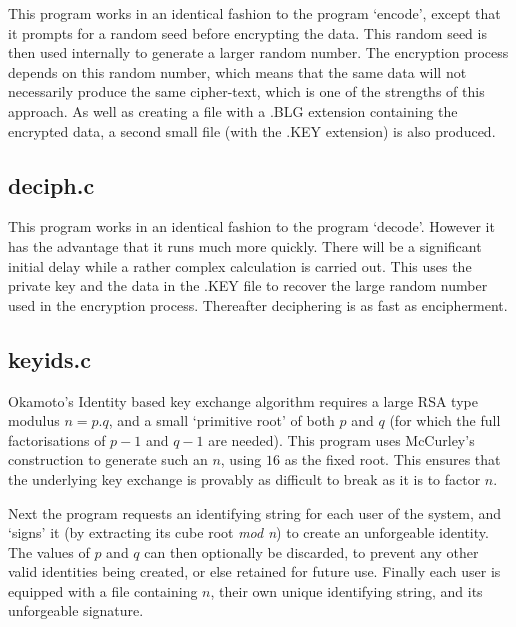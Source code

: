       This program works in an identical fashion to the  program  `encode', 
      except that it prompts for a random seed before encrypting the data.
      This random seed is then used internally to generate a larger random 
      number. The encryption process depends on this random number, which
      means that the same data will not necessarily produce the same 
      cipher-text, which is one of the strengths of this approach. As well as 
      creating a file with a .BLG extension containing the encrypted data,
      a second small file (with the .KEY extension) is also produced.


      \subsection{deciph.c}

      This program works in an identical fashion to the  program  `decode'.  
      However it has the advantage that it runs much more quickly. There will
      be a significant initial delay while a rather complex calculation 
      is carried out. This uses the private key and the data in the .KEY file
      to recover the large random number used in the encryption process. 
      Thereafter deciphering is as fast as encipherment.

      \subsection{keyids.c}

      Okamoto's Identity based key exchange algorithm \cite{Okamoto} requires 
      a large RSA type modulus $n=p.q$, and a small `primitive root' of both 
      $p$ and $q$ (for which the full factorisations of $p-1$ and $q-1$ 
      are needed). This program uses McCurley's construction \cite{McCurley} 
      to generate such an $n$, using $16$ as the fixed root. This ensures that 
      the underlying key exchange is provably as difficult to break as it is to 
      factor $n$.  

      Next the program requests an identifying string for each user of the 
      system, and `signs' it (by extracting its cube root {\em mod n}) 
      to create an unforgeable identity. The values of $p$ and $q$ can 
      then optionally be discarded, to prevent any other valid identities 
      being created, or else retained for future use.
      Finally each user is equipped with a file containing $n$, their own 
      unique identifying string, and its unforgeable signature.


